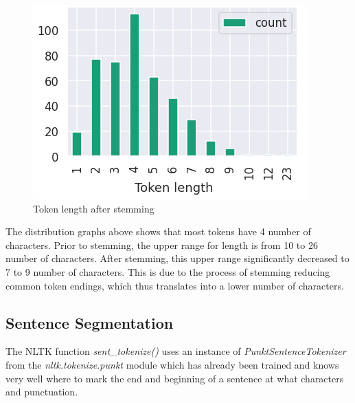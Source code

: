 \documentclass[sigconf,nonacm=true]{acmart}
\begin{document}
\begin{figure}[H]
    \centering
    \includegraphics[scale=0.55]{ss2.png}
   	\caption{Token length after stemming}
\end{figure}
The distribution graphs above shows that most tokens have 4 number of characters. Prior to stemming, the upper range for length is from 10 to 26 number of characters. After stemming, this upper range significantly decreased to 7 to 9 number of characters. This is due to the process of stemming reducing common token endings, which thus translates into a lower number of characters. 

\subsection{Sentence Segmentation}
The NLTK function \textit{sent\_tokenize()} uses an instance of \textit{PunktSentenceTokenizer} from the \textit{nltk.tokenize.punkt} module which has already been trained and knows very well where to mark the end and beginning of a sentence at what characters and punctuation. \smallskip
\end{document}
